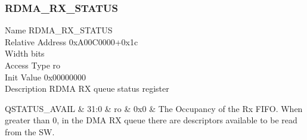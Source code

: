 \documentclass[10pt,a4paper]{paper}
\begin{document}
\subsubsection{RDMA\_RX\_STATUS} \label{reg:rdma_rx_status}
\begin{regdescription}
	Name			\> RDMA\_RX\_STATUS\\
	Relative Address	\> 0xA00C0000+0x1c\\
	Width			 bits\\
	Access Type		\> ro\\
	Init Value		\> 0x00000000\\
	Description		\> RDMA RX queue status register\\
\end{regdescription}
\begin{regdetails}
	\hline QSTATUS\_AVAIL & 31:0 & ro & 0x0 & The Occupancy of the Rx FIFO. When greater than 0, in the DMA RX
	queue there are descriptors available to be read from the SW.\\
\end{regdetails}
\end{document}
